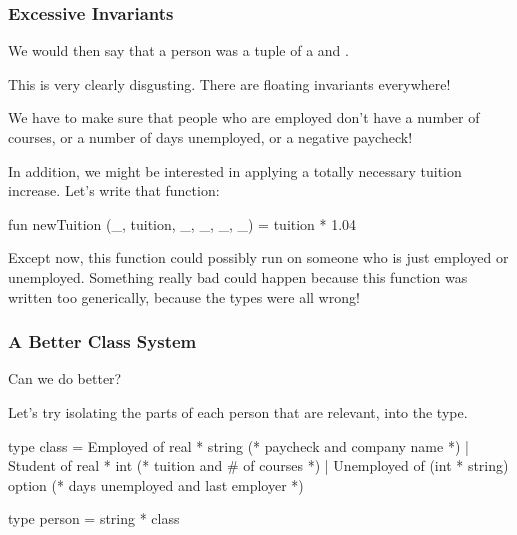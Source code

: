 \documentclass[aspectratio=169, handout]{beamer}
\begin{document}
\begin{frame}[fragile]
  \frametitle{Excessive Invariants}

  We would then say that a person was a tuple of a  and .

  \pause
  \vspace{\fill}

  This is very clearly disgusting. There are floating invariants everywhere!

  \pause
  \vspace{\fill}

  We have to make sure that people who are employed don't have a number of
  courses, or a number of days unemployed, or a negative paycheck!

  \pause
  \vspace{\fill}

  In addition, we might be interested in applying a totally necessary tuition
  increase. Let's write that function:

  \begin{codeblock}
    fun newTuition (_, tuition, _, _, _, _) = tuition * 1.04
  \end{codeblock}

  \pause
  \vspace{\fill}

  Except now, this function could possibly run on someone who is just
  employed or unemployed. Something really bad could happen because this
  function was written too generically, because the types were all wrong!
\end{frame}

\begin{frame}[fragile]
  \frametitle{A Better Class System}

  Can we do better?

  \pause
  \vspace{\fill}

  Let's try isolating the parts of each person that are relevant, into
  the  type.

  \pause
  \vspace{\fill}

  \begin{codeblock}
    type class =
        Employed of real * string
          (* paycheck and company name *)
      | Student of real * int
          (* tuition and # of courses *)
      | Unemployed of (int * string) option
          (* days unemployed and last employer *)

    type person = string * class
  \end{codeblock}
\end{frame}
\end{document}
